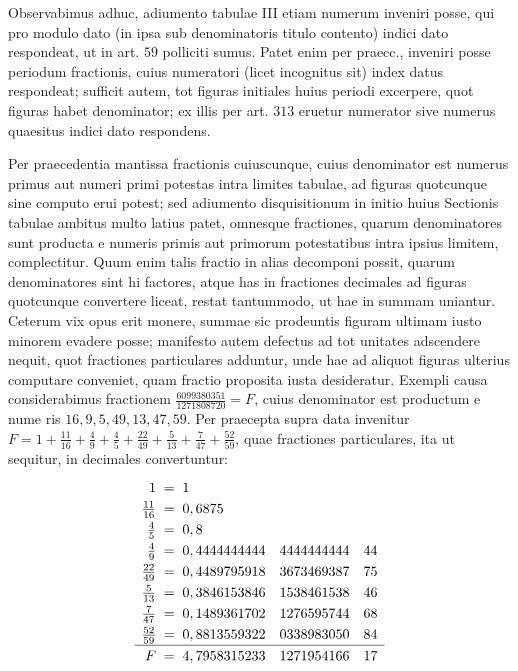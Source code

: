 Observabimus adhuc, adiumento tabulae III etiam numerum inveniri posse, qui pro modulo dato (in ipsa sub denominatoris titulo contento) indici dato respondeat, ut in art. \(59\) polliciti sumus. Patet enim per praecc., inveniri posse periodum fractionis, cuius numeratori (licet incognitus sit) index datus respondeat; sufficit autem, tot figuras initiales huius periodi excerpere, quot figuras habet denominator; ex illis per art. \(313\) eruetur numerator sive numerus quaesitus indici dato respondens.

Per praecedentia mantissa fractionis cuiuscunque, cuius denominator est numerus primus aut numeri primi potestas intra limites tabulae, ad figuras quotcunque sine computo erui potest; sed adiumento disquisitionum in initio huius Sectionis tabulae ambitus multo latius patet, omnesque fractiones, quarum denominatores sunt producta e numeris primis aut primorum potestatibus intra ipsius limitem, complectitur. Quum enim talis fractio in alias decomponi possit, quarum denominatores sint hi factores, atque has in fractiones decimales ad figuras quotcunque convertere liceat, restat tantummodo, ut hae in summam uniantur. Ceterum vix opus erit monere, summae sic prodeuntis figuram ultimam iusto minorem evadere posse; manifesto autem defectus ad tot unitates adscendere nequit, quot fractiones particulares adduntur, unde hae ad aliquot figuras ulterius computare conveniet, quam fractio proposita iusta desideratur. Exempli causa considerabimus fractionem \(\frac{6099380351}{1271808720}=F\), cuius denominator est productum e nume%
ris \(16,\allowbreak 9,\allowbreak 5,\allowbreak 49,\allowbreak 13,\allowbreak 47,\allowbreak 59\). Per praecepta supra data invenitur \(F=1+\frac{11}{16}+\frac49+\frac45+\frac{22}{49}+\frac5{13}+\frac7{47}+\frac{52}{59}\), quae fractiones particulares, ita ut sequitur, in decimales convertuntur:
\[\renewcommand{\arraystretch}{1.25}\begin{array}{r@{\;}c@{\;}l@{\quad}l@{\quad}l}
1&{}={}&1&&\\
\frac{11}{16}&{}={}&0,6875&&\\
\frac45&{}={}&0,8&&\\
\frac49&{}={}&0,4444444444&4444444444&44\\
\frac{22}{49}&{}={}&0,4489795918&3673469387&75\\
\frac5{13}&{}={}&0,3846153846&1538461538&46\\
\frac7{47}&{}={}&0,1489361702&1276595744&68\\
\frac{52}{59}&{}={}&0,8813559322&0338983050&84\\\hline
F&{}={}&4,7958315233&1271954166&17
\end{array}\]
